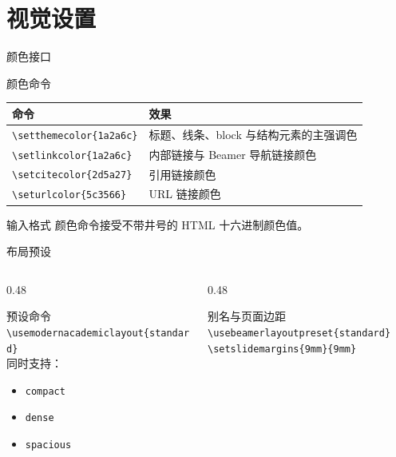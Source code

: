 \documentclass[aspectratio=169,10pt]{ctexbeamer}
\begin{document}
\section{视觉设置}

\begin{academicframe}[主题色与链接颜色命令]{颜色接口}
  \begin{block}{颜色命令}
    \scriptsize
    \begin{tabular}{ll}
      \toprule
      命令 & 效果 \\
      \midrule
      \texttt{\textbackslash setthemecolor\{1a2a6c\}} & 标题、线条、block 与结构元素的主强调色 \\
      \texttt{\textbackslash setlinkcolor\{1a2a6c\}} & 内部链接与 Beamer 导航链接颜色 \\
      \texttt{\textbackslash setcitecolor\{2d5a27\}} & 引用链接颜色 \\
      \texttt{\textbackslash seturlcolor\{5c3566\}} & URL 链接颜色 \\
      \bottomrule
    \end{tabular}
  \end{block}

  \vspace{0.45em}
  \begin{alertblock}{输入格式}
    \small
    颜色命令接受不带井号的 HTML 十六进制颜色值。
  \end{alertblock}
\end{academicframe}

\begin{academicframe}{布局预设}
  \begin{columns}[T,onlytextwidth]
    \begin{column}{0.48\textwidth}
      \begin{block}{预设命令}
        \scriptsize
        \texttt{\textbackslash usemodernacademiclayout\{standard\}}\\[0.6em]
        同时支持：
        \begin{itemize}
          \item \texttt{compact}
          \item \texttt{dense}
          \item \texttt{spacious}
        \end{itemize}
      \end{block}
    \end{column}
    \begin{column}{0.48\textwidth}
      \begin{exampleblock}{别名与页面边距}
        \scriptsize
        \texttt{\textbackslash usebeamerlayoutpreset\{standard\}}\\[0.5em]
        \texttt{\textbackslash setslidemargins\{9mm\}\{9mm\}}
      \end{exampleblock}
    \end{column}
  \end{columns}
\end{academicframe}
\end{document}
